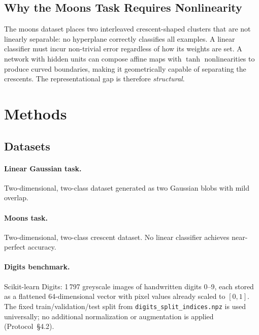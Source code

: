 \documentclass[11pt]{article}
\begin{document}
\subsection{Why the Moons Task Requires Nonlinearity}
\label{subsec:moons_geometry}

The moons dataset places two interleaved crescent-shaped clusters that are not
linearly separable: no hyperplane correctly classifies all examples.
A linear classifier must incur non-trivial error regardless of how its weights
are set.
A network with hidden units can compose affine maps with $\tanh$ nonlinearities
to produce curved boundaries, making it geometrically capable of separating
the crescents.
The representational gap is therefore \emph{structural}.

\section{Methods}
\label{sec:methods}

\subsection{Datasets}

\paragraph{Linear Gaussian task.}
Two-dimensional, two-class dataset generated as two Gaussian blobs with mild
overlap.

\paragraph{Moons task.}
Two-dimensional, two-class crescent dataset.
No linear classifier achieves near-perfect accuracy.

\paragraph{Digits benchmark.}
Scikit-learn Digits: 1\,797 greyscale images of handwritten digits 0--9, each
stored as a flattened 64-dimensional vector with pixel values already scaled
to $[0,1]$.
The fixed train/validation/test split from \texttt{digits\_split\_indices.npz}
is used universally; no additional normalization or augmentation is applied
(Protocol~\S4.2).
\end{document}
